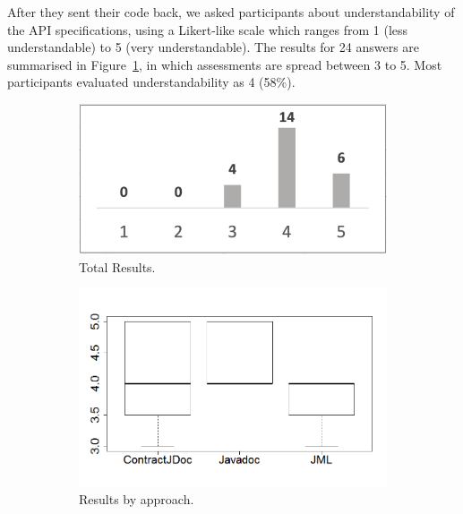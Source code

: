 After they sent their code back, we asked participants about understandability of the API specifications, using a Likert-like scale which ranges from 1 (less understandable) to 5 (very understandable). The results for 24 answers are summarised in Figure~\ref{fig:ExpAnswersTotal}, in which assessments are spread between 3 to 5. Most participants evaluated understandability as 4 (58\%).

\begin{figure}
\centering
\begin{subfigure}{.32\textwidth}
\includegraphics[width=1\textwidth]{figs/ExpAnswersTotal.png}
\caption{Total Results.}
\label{fig:ExpAnswersTotal}
\end{subfigure}
\begin{subfigure}{.33\textwidth}
\includegraphics[width=1\linewidth]{figs/boxplotApproachesEmpiricalStudy}
\caption{Results by approach.}
\label{fig:approachesEmpirical}
\end{subfigure}
\begin{subfigure}{.33\textwidth}

\end{subfigure}
\end{figure}
